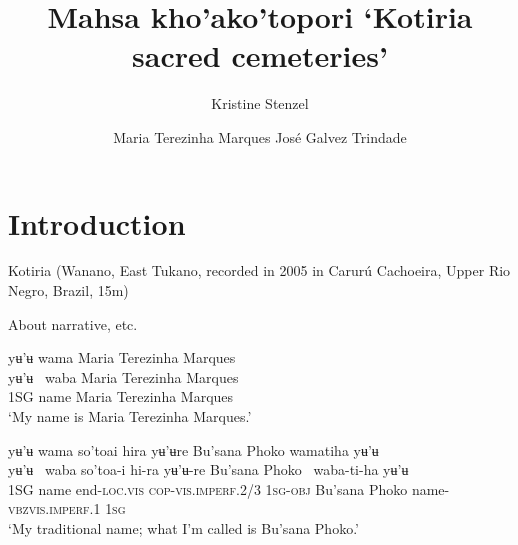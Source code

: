 \documentclass[output=paper]{LSP/langsci}
\author{Kristine Stenzel\affiliation{Federal University of Rio de Janeiro} 
 \and  Maria Terezinha Marques   
 \lastand José Galvez Trindade
}
\title{Mahsa kho'ako'topori 
 ‘Kotiria sacred cemeteries’
 }
\begin{document}
\section{Introduction}

Kotiria (Wanano, East Tukano, recorded in 2005 in Carurú Cachoeira, Upper Rio Negro, Brazil, 15m)

About narrative, etc.


\ea
yʉ'ʉ wama  Maria   Terezinha      Marques\\[.6em]
\gll yʉ'ʉ ~waba Maria   Terezinha      Marques\\
1SG    name   Maria   Terezinha      Marques\\
\glt ‘My name is Maria Terezinha Marques.’
\z

\ea
yʉ'ʉ wama  so'toai         hira                yʉ'ʉre    Bu'sana              Phoko             wamatiha                 yʉ'ʉ\\[.6em]
\gll yʉ'ʉ ~waba so'toa-i       hi-ra             yʉ'ʉ-re           Bu'sana              Phoko ~waba-ti-ha           yʉ'ʉ\\
1SG    name  end-\textsc{loc.vis}  \textsc{cop}-\textsc{vis.imperf.2/3} \textsc{1sg}-\textsc{obj} Bu'sana              Phoko name-\textsc{vbz}\textsc{vis.imperf.1} \textsc{1sg}\\
\glt ‘My traditional name; what I'm called is Bu'sana Phoko.’
\z



\printbibliography[heading=subbibliography,notkeyword=this]
\end{document}
